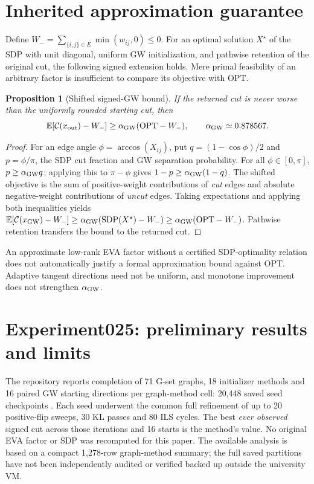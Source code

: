 \documentclass[10pt,letterpaper]{article}
\newtheorem{proposition}{Proposition}
\newcommand{\Ccut}{\mathcal C}
\begin{document}
\section{Inherited approximation guarantee}
Define \(W_-=\sum_{\{i,j\}\in E}\min(w_{ij},0)\le0\). For an optimal solution \(X^\star\) of the SDP with unit diagonal, uniform GW initialization, and pathwise retention of the original cut, the following signed extension holds. Mere primal feasibility of an arbitrary factor is insufficient to compare its objective with \(\mathrm{OPT}\).
\begin{proposition}[Shifted signed-GW bound]
If the returned cut is never worse than the uniformly rounded starting cut, then
\begin{equation}\label{eq:shift}
\mathbb E[\Ccut(x_{\rm out})-W_-]\ge
\alpha_{\rm GW}(\mathrm{OPT}-W_-),\qquad \alpha_{\rm GW}\simeq0.878567.
\end{equation}
\end{proposition}
\begin{proof}
For an edge angle \(\phi=\arccos(X_{ij})\), put \(q=(1-\cos\phi)/2\) and \(p=\phi/\pi\), the SDP cut fraction and GW separation probability. For all \(\phi\in[0,\pi]\), \(p\ge\alpha_{\rm GW}q\); applying this to \(\pi-\phi\) gives \(1-p\ge\alpha_{\rm GW}(1-q)\). The shifted objective is the sum of positive-weight contributions of \emph{cut} edges and absolute negative-weight contributions of \emph{uncut} edges. Taking expectations and applying both inequalities yields \(\mathbb E[\Ccut(x_{\rm GW})-W_-]\ge\alpha_{\rm GW}(\mathrm{SDP}(X^\star)-W_-)\ge\alpha_{\rm GW}(\mathrm{OPT}-W_-)\). Pathwise retention transfers the bound to the returned cut.
\end{proof}
An approximate low-rank EVA factor without a certified SDP-optimality relation does not automatically justify a formal approximation bound against \(\mathrm{OPT}\). Adaptive tangent directions need not be uniform, and monotone improvement does not strengthen \(\alpha_{\rm GW}\).

\section{Experiment025: preliminary results and limits}
The repository reports completion of 71 G-set graphs, 18 initializer methods and 16 paired GW starting directions per graph-method cell: 20,448 saved seed checkpoints \citep{maxkcutrepo}. Each seed underwent the common full refinement of up to 20 positive-flip sweeps, 30 KL passes and 80 ILS cycles. The best \emph{ever observed} signed cut across those iterations and 16 starts is the method's value. No original EVA factor or SDP was recomputed for this paper. The available analysis is based on a compact 1,278-row graph-method summary; the full saved partitions have not been independently audited or verified backed up outside the university VM.
\end{document}
